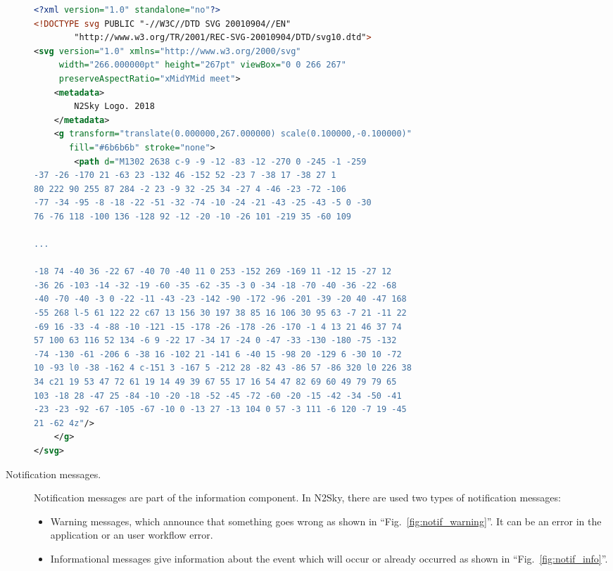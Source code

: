 \begin{description}
\begin{lstlisting}[language=XML, caption=SVG example]
<?xml version="1.0" standalone="no"?>
<!DOCTYPE svg PUBLIC "-//W3C//DTD SVG 20010904//EN"
        "http://www.w3.org/TR/2001/REC-SVG-20010904/DTD/svg10.dtd">
<svg version="1.0" xmlns="http://www.w3.org/2000/svg"
     width="266.000000pt" height="267pt" viewBox="0 0 266 267"
     preserveAspectRatio="xMidYMid meet">
    <metadata>
        N2Sky Logo. 2018
    </metadata>
    <g transform="translate(0.000000,267.000000) scale(0.100000,-0.100000)"
       fill="#6b6b6b" stroke="none">
        <path d="M1302 2638 c-9 -9 -12 -83 -12 -270 0 -245 -1 -259
-37 -26 -170 21 -63 23 -132 46 -152 52 -23 7 -38 17 -38 27 1
80 222 90 255 87 284 -2 23 -9 32 -25 34 -27 4 -46 -23 -72 -106 
-77 -34 -95 -8 -18 -22 -51 -32 -74 -10 -24 -21 -43 -25 -43 -5 0 -30 
76 -76 118 -100 136 -128 92 -12 -20 -10 -26 101 -219 35 -60 109 

...

-18 74 -40 36 -22 67 -40 70 -40 11 0 253 -152 269 -169 11 -12 15 -27 12 
-36 26 -103 -14 -32 -19 -60 -35 -62 -35 -3 0 -34 -18 -70 -40 -36 -22 -68
-40 -70 -40 -3 0 -22 -11 -43 -23 -142 -90 -172 -96 -201 -39 -20 40 -47 168
-55 268 l-5 61 122 22 c67 13 156 30 197 38 85 16 106 30 95 63 -7 21 -11 22
-69 16 -33 -4 -88 -10 -121 -15 -178 -26 -178 -26 -170 -1 4 13 21 46 37 74
57 100 63 116 52 134 -6 9 -22 17 -34 17 -24 0 -47 -33 -130 -180 -75 -132
-74 -130 -61 -206 6 -38 16 -102 21 -141 6 -40 15 -98 20 -129 6 -30 10 -72
10 -93 l0 -38 -162 4 c-151 3 -167 5 -212 28 -82 43 -86 57 -86 320 l0 226 38
34 c21 19 53 47 72 61 19 14 49 39 67 55 17 16 54 47 82 69 60 49 79 79 65
103 -18 28 -47 25 -84 -10 -20 -18 -52 -45 -72 -60 -20 -15 -42 -34 -50 -41
-23 -23 -92 -67 -105 -67 -10 0 -13 27 -13 104 0 57 -3 111 -6 120 -7 19 -45
21 -62 4z"/>
    </g>
</svg>
\end{lstlisting}

\item[Notification messages.] Notification messages are part of the information component. In N2Sky, there are used two types of notification messages: 
\begin{itemize}
\item Warning messages, which announce that something goes wrong as shown in ``Fig.~\ref{fig:notif_warning}''. It can be an error in the application or an user workflow error. 
\item Informational messages give information about the event which will occur or already occurred as shown in ``Fig.~\ref{fig:notif_info}''.
\end{itemize}



\end{description}
